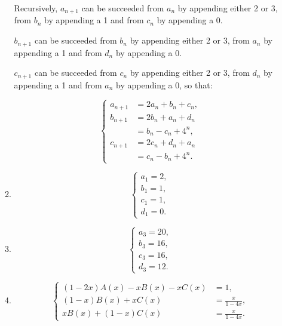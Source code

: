 \documentclass{sig-alternate-05-2015}
\begin{document}
\begin{enumerate}
\begin{enumerate}
		Recursively, $a_{n + 1}$ can be succeeded from $a_n$ by appending either 2 or 3, from $b_n$ by appending a 1 and from $c_n$ by appending a 0.
		
		$b_{n + 1}$ can be succeeded from $b_n$ by appending either 2 or 3, from $a_n$ by appending a 1 and from $d_n$ by appending a 0.
		
		$c_{n + 1}$ can be succeeded from $c_n$ by appending either 2 or 3, from $d_n$ by appending a 1 and from $a_n$ by appending a 0, so that:
		
		\begin{equation}
			\begin{cases}
			a_{n+1} & = 2a_n + b_n + c_n,\\
			b_{n+1} & = 2b_n + a_n + d_n\\
			& = b_n - c_n + 4^n,\\
			c_{n+1} & = 2c_n + d_n + a_n\\
			& = c_n - b_n + 4^n.
			\end{cases}
		\end{equation}
		
		\item \begin{equation}
			\begin{cases}
			a_1 = 2,\\
			b_1 = 1,\\
			c_1 = 1,\\
			d_1 = 0.
			\end{cases}
		\end{equation}
		
		\item \begin{equation}
			\begin{cases}
			a_3 = 20,\\
			b_3 = 16,\\
			c_3 = 16,\\
			d_3 = 12.
			\end{cases}
		\end{equation}
		
		\item \begin{equation}
			\begin{cases}
			(1 - 2x)A(x) - x B(x) - x C(x) & = 1,\\
			(1 - x) B(x) + x C(x) & = \frac{x}{1 - 4x},\\
			x B(x) + (1 - x) C(x) & = \frac{x}{1 - 4x}.
			\end{cases}
		\end{equation}
		

\end{enumerate}
\end{enumerate}
\end{document}
